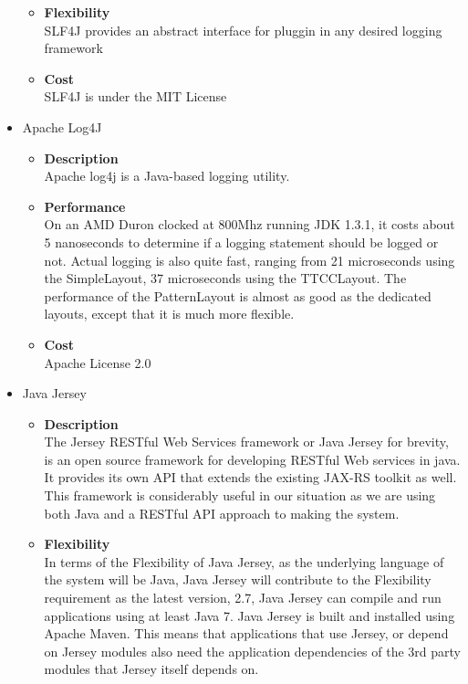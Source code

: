 \documentclass[a4paper,10pt]{article}
\begin{document}
\begin{itemize}
\begin{itemize}
				\item \textbf{Flexibility}\\
					SLF4J provides an abstract interface for pluggin in any desired logging framework 			
				\item \textbf{Cost}\\
				SLF4J is under the MIT License
			\end{itemize}

		\item Apache Log4J
			\begin{itemize}
				\item \textbf{Description}\\
					Apache log4j is a Java-based logging utility.
				\item \textbf{Performance}\\
					On an AMD Duron clocked at 800Mhz running JDK 1.3.1, it costs about 5 nanoseconds to determine if a logging statement should be logged or not. Actual logging is also quite fast, ranging from 21 microseconds using the SimpleLayout, 37 microseconds using the TTCCLayout. The performance of the PatternLayout is almost as good as the dedicated layouts, except that it is much more flexible.
				\item \textbf{Cost}\\
					Apache License 2.0
			\end{itemize}

		\item Java Jersey
			\begin{itemize}
				\item \textbf{Description}\\
				The Jersey RESTful Web Services framework or Java Jersey for brevity, is an open source framework for developing RESTful Web services in java. It provides its own API that extends the existing JAX-RS toolkit as well. This framework is considerably useful in our situation as we are using both Java and a RESTful API approach to making the system.
				\item \textbf{Flexibility}\\
				In terms of the Flexibility of Java Jersey, as the underlying language of the system will be Java, Java Jersey will contribute to the Flexibility requirement as the latest version, 2.7, Java Jersey can compile and run applications using at least Java 7. Java Jersey is built and installed using Apache Maven. This means that applications that use Jersey, or depend on Jersey modules also need the application dependencies of the 3rd party modules that Jersey itself depends on.


\end{itemize}
\end{itemize}
\end{document}
